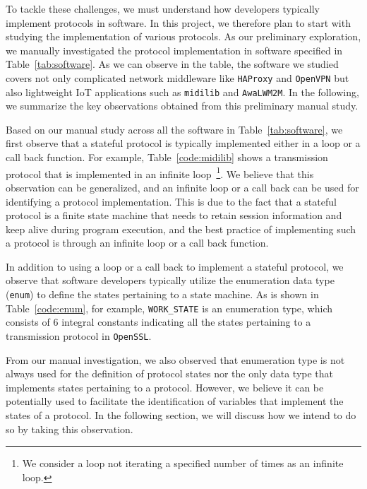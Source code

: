 To tackle these challenges, we must understand how developers typically
implement protocols in software. In this project, we therefore plan to start
with studying the implementation of various protocols. As our preliminary
exploration, we manually investigated the protocol implementation in software
specified in Table~\ref{tab:software}. As we can observe in the table, the
software we studied covers not only complicated network middleware like
\texttt{HAProxy} and \texttt{OpenVPN} but also lightweight IoT applications such
as \texttt{midilib} and \texttt{AwaLWM2M}. In the following, we summarize the
key observations obtained from this preliminary manual study.

Based on our manual study across all the software in Table~\ref{tab:software},
we first observe that a stateful protocol is typically implemented either in a
loop or a call back function. For example, Table~\ref{code:midilib} shows a
transmission protocol that is implemented in an infinite loop~\footnote{We consider 
a loop not iterating a specified number of times as an infinite loop.}. 
We believe that
this observation can be generalized, and an infinite loop or a call back can be
used for identifying a protocol implementation. This is due to the fact that a
stateful protocol is a finite state machine that needs to retain session
information and keep alive during program execution, and the best practice of
implementing such a protocol is through an infinite loop or a call back
function.

In addition to using a loop or a call back to implement a stateful protocol, we
observe that software developers typically utilize the enumeration data type
(\texttt{enum}) to define the states pertaining to a state machine. As is shown
in Table~\ref{code:enum}, for example, \texttt{WORK\_STATE} is an enumeration
type, which consists of 6 integral constants indicating all the states
pertaining to a transmission protocol in \texttt{OpenSSL}.

From our manual investigation,  we also observed that enumeration type is not
always used for the definition of protocol states nor the only data type that
implements states pertaining to a protocol. However, we believe it can be
potentially used to facilitate the identification of variables that implement
the states of a protocol. In the following section, we will discuss how we
intend to do so by taking this observation.


